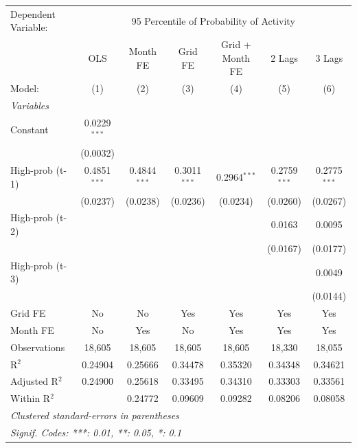 \documentclass[12pt]{article}
\begin{document}
\begingroup
\centering
\begin{tabular}{lcccccc}
   \tabularnewline \midrule \midrule
   Dependent Variable: & \multicolumn{6}{c}{95 Percentile of Probability of Activity}\\
                   & OLS            & Month FE       & Grid FE        & Grid + Month FE & 2 Lags         & 3 Lags \\   
   Model:          & (1)            & (2)            & (3)            & (4)             & (5)            & (6)\\  
   \midrule
   \emph{Variables}\\
   Constant        & 0.0229$^{***}$ &                &                &                 &                &   \\   
                   & (0.0032)       &                &                &                 &                &   \\   
   High-prob (t-1) & 0.4851$^{***}$ & 0.4844$^{***}$ & 0.3011$^{***}$ & 0.2964$^{***}$  & 0.2759$^{***}$ & 0.2775$^{***}$\\   
                   & (0.0237)       & (0.0238)       & (0.0236)       & (0.0234)        & (0.0260)       & (0.0267)\\   
   High-prob (t-2) &                &                &                &                 & 0.0163         & 0.0095\\   
                   &                &                &                &                 & (0.0167)       & (0.0177)\\   
   High-prob (t-3) &                &                &                &                 &                & 0.0049\\   
                   &                &                &                &                 &                & (0.0144)\\   
   Grid FE         & No             & No             & Yes            & Yes             & Yes            & Yes\\  
   Month FE        & No             & Yes            & No             & Yes             & Yes            & Yes\\  
   \midrule
   Observations    & 18,605         & 18,605         & 18,605         & 18,605          & 18,330         & 18,055\\  
   R$^2$           & 0.24904        & 0.25666        & 0.34478        & 0.35320         & 0.34348        & 0.34621\\  
   Adjusted R$^2$  & 0.24900        & 0.25618        & 0.33495        & 0.34310         & 0.33303        & 0.33561\\  
   Within R$^2$    &                & 0.24772        & 0.09609        & 0.09282         & 0.08206        & 0.08058\\  
   \midrule \midrule
   \multicolumn{7}{l}{\emph{Clustered standard-errors in parentheses}}\\
   \multicolumn{7}{l}{\emph{Signif. Codes: ***: 0.01, **: 0.05, *: 0.1}}\\
\end{tabular}
\par\endgroup
\end{document}

